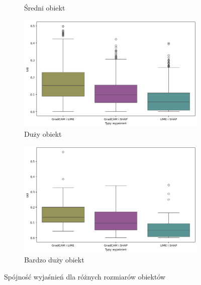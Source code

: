 \begin{figure}[h]
\begin{subfigure}[b]{0.3\textwidth}
		\caption{Średni obiekt}  \label{}
	\end{subfigure}
	\begin{subfigure}[b]{0.3\textwidth}
		\centering\includegraphics[width=1\textwidth]{img/base_coherence_size_L}
		\caption{Duży obiekt}  \label{}
	\end{subfigure}
	\begin{subfigure}[b]{0.3\textwidth}
		\centering\includegraphics[width=1\textwidth]{img/base_coherence_size_XL}
		\caption{Bardzo duży obiekt}  \label{}
	\end{subfigure}
	\caption{Spójność wyjaśnień dla różnych rozmiarów obiektów}
	\label{rys:coherence_size}
\end{figure}

